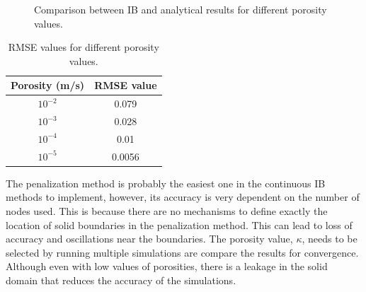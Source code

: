 \begin{figure}[H]
{    }
    \quad
    \caption{Comparison between IB and analytical results for different porosity values.}
    \label{fig:C3_penalizationResultPorosity}
\end{figure}

\begin{table}[H]
\centering
\begin{tabular}{c | c}
    Porosity (m/s) & RMSE value \\ \hline \hline
    $10^{-2}$ & 0.079 \\ \hline
    $10^{-3}$ & 0.028 \\ \hline
    $10^{-4}$ & 0.01 \\ \hline
    $10^{-5}$ & 0.0056
\end{tabular}
\caption{RMSE values for different porosity values.}
\label{table:C3_penalizationResultPorosityRMSE}
\end{table}

The penalization method is probably the easiest one in the continuous IB methods to implement, however, its accuracy is very dependent on the number of nodes used. This is because there are no mechanisms to define exactly the location of solid boundaries in the penalization method. This can lead to loss of accuracy and oscillations near the boundaries. The porosity value, $\kappa$, needs to be selected by running multiple simulations are compare the results for convergence. Although even with low values of porosities, there is a leakage in the solid domain that reduces the accuracy of the simulations.